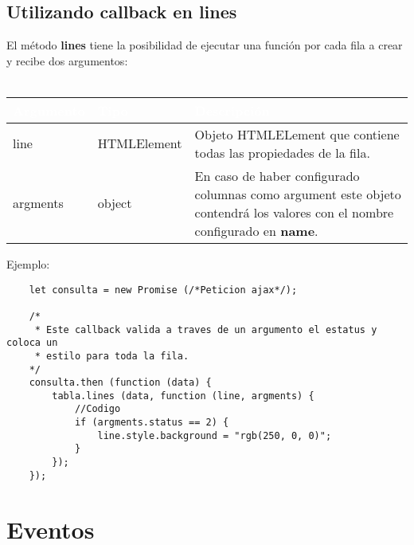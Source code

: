 \documentclass[10pt]{article}
\begin{document}
\subsection{Utilizando callback en lines}

El método \textbf{lines} tiene la posibilidad de ejecutar una función por cada fila a crear y recibe dos argumentos:
\\\\
\begin{tabular}{|m{1.8cm}|m{2.5cm}|m{10.4cm}|}
	\hline
	\rowcolor{black}\textcolor{white}{Argumento} & \textcolor{white}{Tipo} & \textcolor{white}{Descripción} \\
	\hline
	line & HTMLElement & Objeto HTMLELement que contiene todas las propiedades de la fila. \\
	\hline
	argments & object & En caso de haber configurado columnas como argument este objeto contendrá los valores con el nombre configurado en \textbf{name}. \\
	\hline
\end{tabular}

\newpage
Ejemplo:

\begin{lstlisting}
	let consulta = new Promise (/*Peticion ajax*/);
	
	/*
	 * Este callback valida a traves de un argumento el estatus y coloca un
	 * estilo para toda la fila.
	*/
	consulta.then (function (data) {
		tabla.lines (data, function (line, argments) {
			//Codigo
			if (argments.status == 2) {
				line.style.background = "rgb(250, 0, 0)";
			}
		});
	});
\end{lstlisting}

\section{Eventos}
\end{document}
